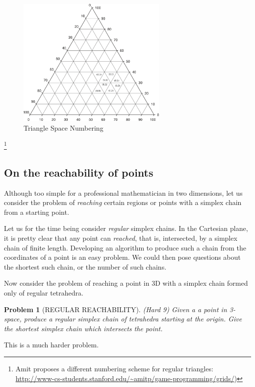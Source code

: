 \documentclass[11pt]{article}
\newtheorem{problem}{Problem}
\begin{document}
\begin{figure}
     \centering
     \includegraphics[width=0.65\textwidth]{figures/Triangle_Plot_-_Major_grid_lines.png}
     \caption{Triangle Space Numbering}
  \label{fig:equitetrabeam}
\end{figure}

\footnote{ Amit proposes a different numbering scheme for regular triangles:
  \url{http://www-cs-students.stanford.edu/~amitp/game-programming/grids/})
}

\subsection{On the reachability of points}

Although too simple for a professional mathematician in two dimensions, let us consider the problem of {\em reaching} certain regions
or points with a simplex chain from a starting point.

Let us for the time being consider {\em regular} simplex chains.  In the Cartesian plane, it is pretty clear that any point can {\em reached},
that is, intersected, by a simplex chain of finite length. Developing an algorithm to produce such a chain from the coordinates of a point
is an easy problem. We could then pose questions about the shortest such chain, or the number of such chains.

Now consider the problem of reaching a point in 3D with a simplex chain formed only of regular tetrahedra.
\begin{problem}[REGULAR REACHABILITY]
  (Hard 9)  Given a a point in 3-space, produce a regular simplex chain of tetrahedra starting at the origin.
  Give the shortest simplex chain which intersects the point.
\end{problem}
This is a much harder problem.
\end{document}
